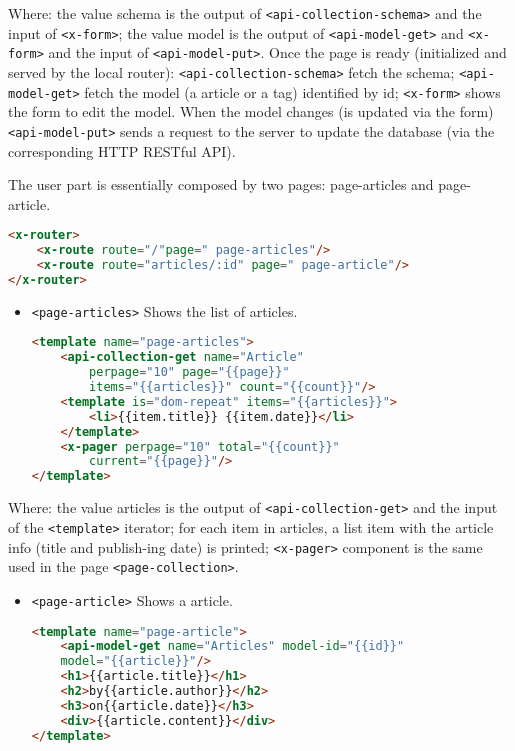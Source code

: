 Where: the value schema is the output of \texttt{<api-collection-schema>} and the input of \texttt{<x-form>}; the value model is the output of \texttt{<api-model-get>} and \texttt{<x-form>} and the input of \texttt{<api-model-put>}. Once the page is ready (initialized and served by the local router): \texttt{<api-collection-schema>} fetch the schema; \texttt{<api-model-get>} fetch the model (a article or a tag) identified by id; \texttt{<x-form>} shows the form to edit the model. When the model changes (is updated via the form) \texttt{<api-model-put>} sends a request to the server to update the database (via the corresponding HTTP RESTful API).


The user part is essentially composed by two pages: page-articles and page-article.

\begin{lstlisting}[language=html]
<x-router>
	<x-route route="/"page=" page-articles"/>
	<x-route route="articles/:id" page=" page-article"/>
</x-router>
\end{lstlisting}

\begin{itemize} \item \texttt{<page-articles>} Shows the list of articles.
\begin{lstlisting}[language=html]
<template name="page-articles">
	<api-collection-get name="Article"
		perpage="10" page="{{page}}"
		items="{{articles}}" count="{{count}}"/>
	<template is="dom-repeat" items="{{articles}}">
		<li>{{item.title}} {{item.date}}</li>
	</template>
	<x-pager perpage="10" total="{{count}}"
		current="{{page}}"/>
</template>
\end{lstlisting}
\end{itemize}

Where: the value articles is the output of \texttt{<api-collection-get>} and the input of the \texttt{<template>} iterator; for each item in articles, a list item with the article info (title and publish-ing date) is printed; \texttt{<x-pager>} component is the same used in the page \texttt{<page-collection>}.

\begin{itemize} \item \texttt{<page-article>} Shows a article.
\begin{lstlisting}[language=html]
<template name="page-article">
	<api-model-get name="Articles" model-id="{{id}}"
	model="{{article}}"/>
	<h1>{{article.title}}</h1>
	<h2>by{{article.author}}</h2>
	<h3>on{{article.date}}</h3>
	<div>{{article.content}}</div>
</template>
\end{lstlisting}
\end{itemize}

